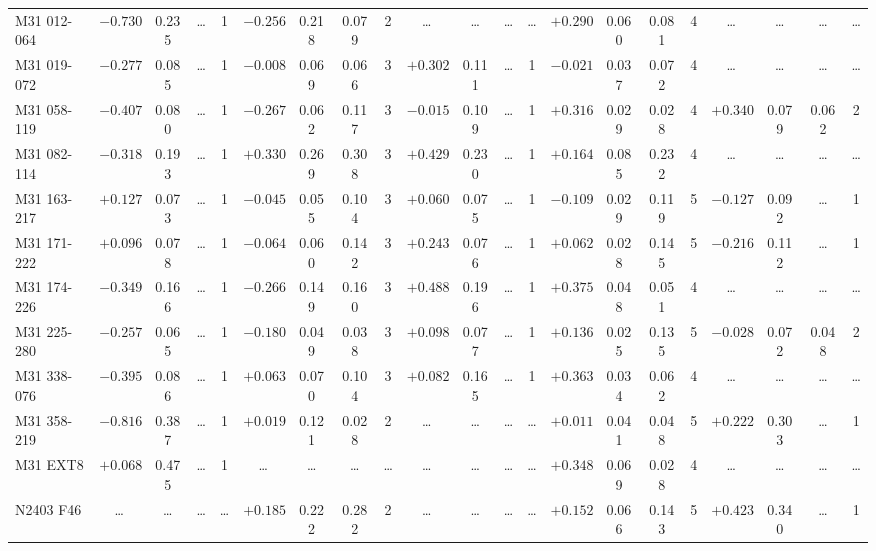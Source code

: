 \documentclass{aa}
\begin{document}
\begin{appendix}
\begin{table*}
\begin{adjustbox}{width=1\textwidth}
{\begin{tabular}{l cccccccccccccccccccc}
M31 012-064   & $-0.730$ & 0.235 & \ldots & 1 & $-0.256$ & 0.218 & 0.079 & 2 & \ldots & \ldots & \ldots & \ldots & $+0.290$ & 0.060 & 0.081 & 4 & \ldots & \ldots & \ldots & \ldots \\
M31 019-072   & $-0.277$ & 0.085 & \ldots & 1 & $-0.008$ & 0.069 & 0.066 & 3 & $+0.302$ & 0.111 & \ldots & 1 & $-0.021$ & 0.037 & 0.072 & 4 & \ldots & \ldots & \ldots & \ldots \\
M31 058-119   & $-0.407$ & 0.080 & \ldots & 1 & $-0.267$ & 0.062 & 0.117 & 3 & $-0.015$ & 0.109 & \ldots & 1 & $+0.316$ & 0.029 & 0.028 & 4 & $+0.340$ & 0.079 & 0.062 & 2 \\
M31 082-114   & $-0.318$ & 0.193 & \ldots & 1 & $+0.330$ & 0.269 & 0.308 & 3 & $+0.429$ & 0.230 & \ldots & 1 & $+0.164$ & 0.085 & 0.232 & 4 & \ldots & \ldots & \ldots & \ldots \\
M31 163-217   & $+0.127$ & 0.073 & \ldots & 1 & $-0.045$ & 0.055 & 0.104 & 3 & $+0.060$ & 0.075 & \ldots & 1 & $-0.109$ & 0.029 & 0.119 & 5 & $-0.127$ & 0.092 & \ldots & 1 \\
M31 171-222   & $+0.096$ & 0.078 & \ldots & 1 & $-0.064$ & 0.060 & 0.142 & 3 & $+0.243$ & 0.076 & \ldots & 1 & $+0.062$ & 0.028 & 0.145 & 5 & $-0.216$ & 0.112 & \ldots & 1 \\
M31 174-226   & $-0.349$ & 0.166 & \ldots & 1 & $-0.266$ & 0.149 & 0.160 & 3 & $+0.488$ & 0.196 & \ldots & 1 & $+0.375$ & 0.048 & 0.051 & 4 & \ldots & \ldots & \ldots & \ldots \\
M31 225-280   & $-0.257$ & 0.065 & \ldots & 1 & $-0.180$ & 0.049 & 0.038 & 3 & $+0.098$ & 0.077 & \ldots & 1 & $+0.136$ & 0.025 & 0.135 & 5 & $-0.028$ & 0.072 & 0.048 & 2 \\
M31 338-076   & $-0.395$ & 0.086 & \ldots & 1 & $+0.063$ & 0.070 & 0.104 & 3 & $+0.082$ & 0.165 & \ldots & 1 & $+0.363$ & 0.034 & 0.062 & 4 & \ldots & \ldots & \ldots & \ldots \\
M31 358-219   & $-0.816$ & 0.387 & \ldots & 1 & $+0.019$ & 0.121 & 0.028 & 2 & \ldots & \ldots & \ldots & \ldots & $+0.011$ & 0.041 & 0.048 & 5 & $+0.222$ & 0.303 & \ldots & 1 \\
M31 EXT8      & $+0.068$ & 0.475 & \ldots & 1 & \ldots & \ldots & \ldots & \ldots & \ldots & \ldots & \ldots & \ldots & $+0.348$ & 0.069 & 0.028 & 4 & \ldots & \ldots & \ldots & \ldots \\
N2403 F46     & \ldots & \ldots & \ldots & \ldots & $+0.185$ & 0.222 & 0.282 & 2 & \ldots & \ldots & \ldots & \ldots & $+0.152$ & 0.066 & 0.143 & 5 & $+0.423$ & 0.340 & \ldots & 1 \\
\hline
\end{tabular}
}
\end{adjustbox}
\end{table*}


\end{appendix}
\end{document}
